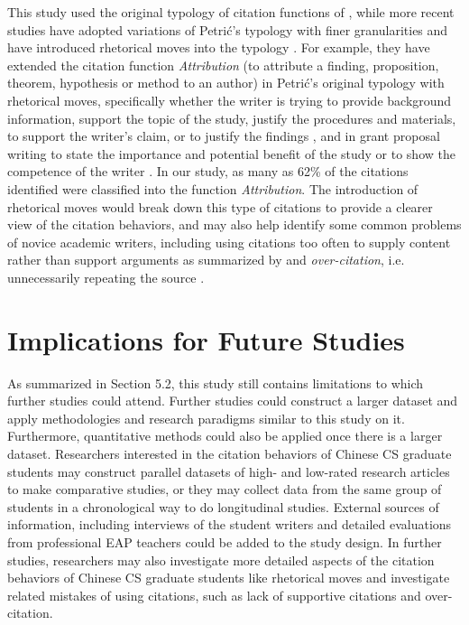 This study used the original typology of citation functions of \citet{petric_rhetorical_2007}, while more recent studies have adopted variations of Petrić’s typology with finer granularities and have introduced rhetorical moves into the typology \citep{fazel_citation_2015,mansourizadeh_citation_2011}. For example, they have extended the citation function \textit{Attribution} (to attribute a finding, proposition, theorem, hypothesis or method to an author) in Petrić’s original typology with rhetorical moves, specifically whether the writer is trying to provide background information, support the topic of the study, justify the procedures and materials, to support the writer’s claim, or to justify the findings \citep{mansourizadeh_citation_2011}, and in grant proposal writing to state the importance and potential benefit of the study or to show the competence of the writer \citep{fazel_citation_2015}. In our study, as many as 62\% of the citations identified were classified into the function \textit{Attribution}. The introduction of rhetorical moves would break down this type of citations to provide a clearer view of the citation behaviors, and may also help identify some common problems of novice academic writers, including using citations too often to supply content rather than support arguments as summarized by \citet{wette_source_2017}  and \textit{over-citation}, i.e. unnecessarily repeating the source \citep{davis_development_2013,petric_legitimate_2012,schmitt_writing_2007}.

\section{Implications for Future Studies}
As summarized in Section 5.2, this study still contains limitations to which further studies could attend. Further studies could construct a larger dataset and apply methodologies and research paradigms similar to this study on it. Furthermore, quantitative methods could also be applied once there is a larger dataset. Researchers interested in the citation behaviors of Chinese CS graduate students may construct parallel datasets of high- and low-rated research articles to make comparative studies, or they may collect data from the same group of students in a chronological way to do longitudinal studies. External sources of information, including interviews of the student writers and detailed evaluations from professional EAP teachers could be added to the study design. In further studies, researchers may also investigate more detailed aspects of the citation behaviors of Chinese CS graduate students like rhetorical moves and investigate related mistakes of using citations, such as lack of supportive citations and over-citation.

